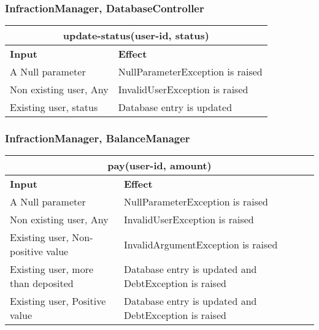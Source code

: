 \subsubsection{InfractionManager, DatabaseController} 
\begin{tabular}{|p{5cm}|p{7cm}|}
\hline
\multicolumn{2}{|c|}{update-status(user-id, status)} \\
\hline
\textbf{Input} & \textbf{Effect} \\

\hline
A Null parameter & NullParameterException is raised \\

\hline
Non existing user, Any & InvalidUserException is raised \\

\hline
Existing user, status & Database entry is updated \\
\hline
\end{tabular}

\subsubsection{InfractionManager, BalanceManager}
\begin{tabular}{|p{5cm}|p{7cm}|}
\hline
\multicolumn{2}{|c|}{pay(user-id, amount)} \\
\hline
\textbf{Input} & \textbf{Effect} \\

\hline
A Null parameter & NullParameterException is raised \\

\hline
Non existing user, Any & InvalidUserException is raised \\

\hline
Existing user, Non-positive value & InvalidArgumentException is raised \\

\hline
Existing user, more than deposited & Database entry is updated and DebtException is raised \\

\hline
Existing user, Positive value & Database entry is updated and DebtException is raised \\
\hline
\end{tabular}

